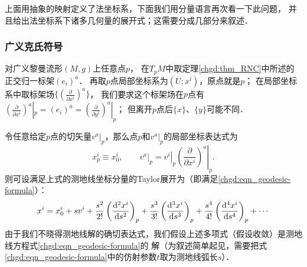 



上面用抽象的映射定义了法坐标系，下面我们用分量语言再次看一下此问题，
并且给出法坐标系下诸多几何量的展开式；这需要分成几部分来叙述．

\subsubsection{广义克氏符号}
对广义黎曼流形$(M,g)$上任意点$p$，
在$T_pM$中取定理\ref{chgd:thm_RNC}中所述的正交归一标架$(e_i)^a$．
再取$p$点局部坐标系为$(U;x^i)$，原点就是$p$；
在局部坐标系中取标架场$\{(\frac{\partial}{\partial x^i})^a\}$，
我们要求这个标架场在$p$点有$(\frac{\partial}{\partial x^i})^a|_p =(e_i)^a
=(\frac{\partial}{\partial y^i})^a|_p $；
但离开$p$点后$\{x\}$、$\{y\}$可能不同．


令任意给定$p$点的切矢量$v^a|_{p}$，那么点$p$和$v^a|_{p}$的局部坐标表达式为
\begin{equation}
    x_p^i\equiv x^i_0, \qquad v^a|_{p} = \left. v^i \right|_{p}
    \left. \left(\frac{\partial}{\partial x^i}\right)^a \right|_{p}.
\end{equation}
则可设满足上式的测地线坐标分量的Taylor展开为（即满足\eqref{chgd:eqn_geodesic-formula}）：
\begin{equation}\label{chgd:eqn_tmpgeodesic-expand}
    x^i = x^i_0 + s v^i  + \frac{s^2}{2!} \left(\frac{{\rm d}^2x^i}{{\rm d} s^2}\right)_{p}
     + \frac{s^3}{3!} \left(\frac{{\rm d}^3 x^i}{{\rm d} s^3}\right)_{p}
     + \frac{s^4}{4!} \left(\frac{{\rm d}^4 x^i}{{\rm d} s^4}\right)_{p}  + \cdots
\end{equation}
由于我们不晓得测地线解的确切表达式，我们假设上述多项式（假设收敛）是测地线方程式\eqref{chgd:eqn_geodesic-formula}的
解（为叙述简单起见，需要把式\eqref{chgd:eqn_geodesic-formula}中的仿射参数$t$取为测地线弧长$s$）．

